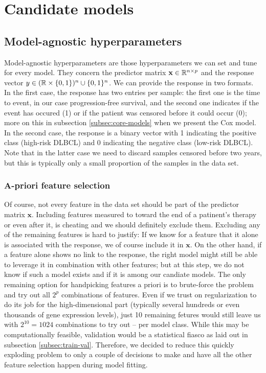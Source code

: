 \section{Candidate models}\label{sec:candidate-models}

\subsection{Model-agnostic hyperparameters}\label{subsec:model-agnostic}

Model-agnostic hyperparameters are those hyperparameters we can set and tune for every model. They 
concern the predictor matrix $\mathbf{x} \in \mathbb{R}^{n \times p}$ and the response vector $y \in 
(\mathbb{R} \times \{ 0, 1 \})^n \cup \{ 0, 1 \}^n$. We can provide the response in two formats. In the 
first case, the response has two entries per sample: the first one is the time to event, in our 
case progression-free survival, and the second one indicates if the event has occured (1) or 
if the patient was censored before it could occur (0); more on this in subsection 
\ref{subsec:core-models} when we present the Cox model. In the second case, the response is a binary 
vector with 1 indicating the positive class (high-risk DLBCL)
and 0 indicating the negative class (low-risk DLBCL). Note that in the latter case we need 
to discard samples censored before two years, but this is typically only a small proportion of the 
samples in the data set.

\subsubsection{A-priori feature selection}

Of course, not every feature in the data set should be part of the predictor matrix $\mathbf{x}$. Including 
features measured to toward the end of a patinent's therapy or even after it, is cheating and we 
should definitely exclude them. Excluding any of the remaining features is hard to justify: If we 
know for a feature that it alone is associated with the response, we of course include it in $\mathbf{x}$.
On the other hand, if a feature alone shows no link to the response, the right model might still be 
able to leverage it in combination with other features; but at this step, we do not know if such 
a model exists and if it is among our candiate models. The only remaining option for handpicking 
features a priori is to brute-force the problem and try out all $2^p$ combinations of features.
Even if we trust on regularization to do its job for the high-dimensional part (typically several 
hundreds or even thousands of gene expression levels), just \num{10} remaining fetures would still
leave us with $2^{10} = 1024$ combinations to try out -- per model class. While this may be 
computationally feasible, validation would be a statistical fiasco as laid out in subsection 
\ref{subsec:train-val}. Therefore, we decided to reduce this quickly exploding problem to only 
a couple of decisions to 
make and have all the other feature selection happen during model fitting. 

